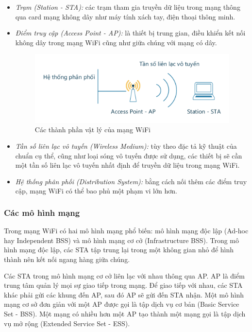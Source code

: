 \begin{itemize}
\item \emph{Trạm (Station - STA):} các trạm tham gia truyền dữ liệu trong mạng thông qua card mạng không dây như máy tính xách tay, điện thoại thông minh.
\item \emph{Điểm truy cập (Access Point - AP):} là thiết bị trung gian, điều khiển kết nối không dây trong mạng WiFi cũng như giữa chúng với mạng có dây.

\begin{figure}[H]
    \centering
    \includegraphics[width=1.0\textwidth]{80211-architecture}
    \caption{
        \label{fig:80211-architecture}
        Các thành phần vật lý của mạng WiFi}%
\end{figure}

\item \emph{Tần số liên lạc vô tuyến (Wireless Medium):} tùy theo đặc tả kỹ thuật của chuẩn cụ thể, cũng như loại sóng vô tuyến được sử dụng, các thiết bị sẽ cần một tần số liên lạc vô tuyến nhất định để truyền dữ liệu trong mạng WiFi.
\item \emph{Hệ thống phân phối (Distribution System):} bằng cách nối thêm các điểm truy cập, mạng WiFi có thể bao phủ một phạm vi lớn hơn.
\end{itemize}

\subsubsection{Các mô hình mạng}
Trong mạng WiFi có hai mô hình mạng phổ biến: mô hình mạng độc lập (Ad-hoc hay Independent BSS) và mô hình mạng cơ cở (Infrastructure BSS). Trong mô hình mạng độc lập, các STA tập trung lại trong một không gian nhỏ để hình thành nên kết nối ngang hàng giữa chúng.%

Các STA trong mô hình mạng cơ cở liên lạc với nhau thông qua AP. AP là điểm trung tâm quản lý mọi sự giao tiếp trong mạng. Để giao tiếp với nhau, các STA khác phải gửi các khung đến AP, sau đó AP sẽ gửi đến STA nhận. Một mô hình mạng cơ sở đơn giản với một AP được gọi là tập dịch vụ cơ bản (Basic Service Set - BSS). Một mạng có nhiều hơn một AP tạo thành một mạng gọi là tập dịch vụ mở rộng (Extended Service Set - ESS).%

